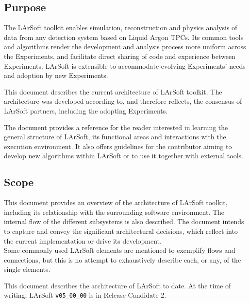 
\subsection{Purpose}
\label{ssec:Introduction:Purpose}

The LArSoft toolkit enables simulation, reconstruction and
physics analysis of data from any detection system based on Liquid Argon TPCs.
Its common tools and algorithms render the development
and analysis process more uniform across the Experiments,
and facilitate direct sharing of code and experience between Experiments.
LArSoft is extensible to accommodate evolving Experiments' needs
and adoption by new Experiments.

This document describes the current architecture of LArSoft toolkit.
The architecture was developed according to, and therefore reflects,
the consensus of LArSoft partners, including the adopting Experiments.

The document provides a reference for the reader interested in learning
the general structure of LArSoft, its functional areas and interactions
with the execution environment.
It also offers guidelines for the contributor aiming to develop new algorithms
within LArSoft or to use it together with external tools.


\subsection{Scope}
\label{ssec:Introduction:Scope}

This document provides an overview of the architecture of LArSoft toolkit,
including its relationship with the surrounding software environment.
The internal flow of the different subsystems is also described.
The document intends to capture and convey the significant architectural decisions,
which reflect into the current implementation or drive its development.\\
Some commonly used LArSoft elements are mentioned to exemplify
flows and connections, but this is no attempt to exhaustively describe
each, or any, of the single elements.

This document describes the architecture of LArSoft to date.
At the time of writing, LArSoft \texttt{v05\_00\_00} is in Release Candidate 2.
